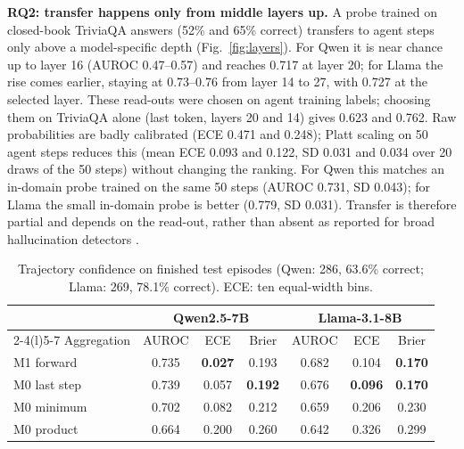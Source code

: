 \documentclass[10pt,twocolumn]{article}
\begin{document}
\textbf{RQ2: transfer happens only from middle layers up.} A probe trained on closed-book TriviaQA answers (52\%
and 65\% correct) transfers to agent steps only above a model-specific depth (Fig.~\ref{fig:layers}). For Qwen it is
near chance up to layer 16 (AUROC 0.47--0.57) and reaches 0.717 at layer 20; for Llama the rise comes earlier,
staying at 0.73--0.76 from layer 14 to 27, with 0.727 at the selected layer. These read-outs were chosen on agent
training labels; choosing them on TriviaQA alone (last token, layers 20 and 14) gives 0.623 and 0.762. Raw
probabilities are badly calibrated (ECE 0.471 and 0.248); Platt scaling on 50 agent steps reduces this (mean ECE
0.093 and 0.122, SD 0.031 and 0.034 over 20 draws of the 50 steps) without changing the ranking. For Qwen this matches an in-domain probe trained on the
same 50 steps (AUROC 0.731, SD 0.043); for Llama the small in-domain probe is better (0.779, SD 0.031). Transfer is
therefore partial and depends on the read-out, rather than absent as reported for broad hallucination detectors
\citep{dubanowska2025representation}.

\begin{table}[t]
\centering\small
\caption{Trajectory confidence on finished test episodes (Qwen: 286, 63.6\% correct; Llama: 269, 78.1\% correct).
ECE: ten equal-width bins.}
\label{tab:rq3}
\footnotesize\setlength{\tabcolsep}{2.6pt}
\begin{tabular}{@{}lcccccc@{}}
\toprule
& \multicolumn{3}{c}{Qwen2.5-7B} & \multicolumn{3}{c}{Llama-3.1-8B} \\
\cmidrule(lr){2-4}\cmidrule(l){5-7}
Aggregation & AUROC & ECE & Brier & AUROC & ECE & Brier \\
\midrule
M1 forward & 0.735 & \textbf{0.027} & 0.193 & 0.682 & 0.104 & \textbf{0.170} \\
M0 last step & 0.739 & 0.057 & \textbf{0.192} & 0.676 & \textbf{0.096} & \textbf{0.170} \\
M0 minimum & 0.702 & 0.082 & 0.212 & 0.659 & 0.206 & 0.230 \\
M0 product & 0.664 & 0.200 & 0.260 & 0.642 & 0.326 & 0.299 \\
\bottomrule
\end{tabular}
\end{table}
\end{document}
